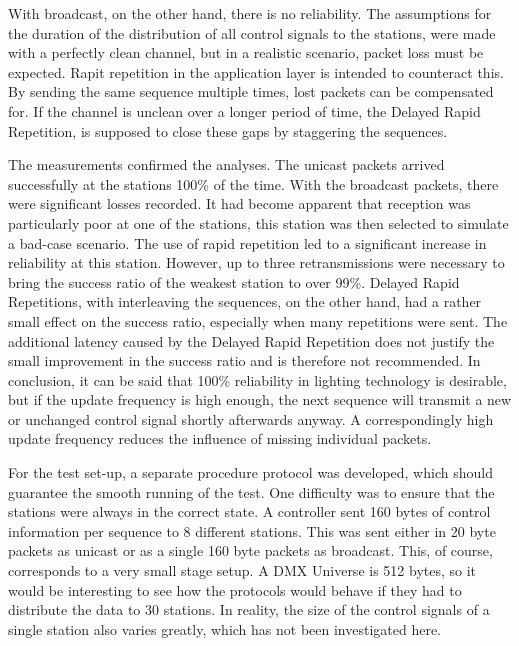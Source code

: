 With broadcast, on the other hand, there is no reliability.
The assumptions for the duration of the distribution of all control signals to the stations,
were made with a perfectly clean channel,
but in a realistic scenario, packet loss must be expected.
Rapit repetition in the application layer is intended to counteract this.
By sending the same sequence multiple times, lost packets can be compensated for.
If the channel is unclean over a longer period of time, the Delayed Rapid Repetition,
is supposed to close these gaps by staggering the sequences.

The measurements confirmed the analyses.
The unicast packets arrived successfully at the stations 100\% of the time.
With the broadcast packets, there were significant losses recorded.
It had become apparent that reception was particularly poor at one of the stations,
this station was then selected to simulate a bad-case scenario.
The use of rapid repetition led to a significant increase in reliability at this station.
However, up to three retransmissions were necessary to bring the success ratio of the weakest station to over 99\%.
Delayed Rapid Repetitions, with interleaving the sequences, on the other hand, 
had a rather small effect on the success ratio,
especially when many repetitions were sent.
The additional latency caused by the Delayed Rapid Repetition
does not justify the small improvement in the success ratio and is therefore not recommended.
In conclusion, it can be said that 100\% reliability in lighting technology is desirable,
but if the update frequency is high enough,
the next sequence will transmit a new or unchanged control signal shortly afterwards anyway.
A correspondingly high update frequency reduces the influence of missing individual packets.

For the test set-up, a separate procedure protocol was developed,
which should guarantee the smooth running of the test.
One difficulty was to ensure that the stations were always in the correct state.
A controller sent 160 bytes of control information per sequence to 8 different stations.
This was sent either in 20 byte packets as unicast or as a single 160 byte packets as broadcast.
This, of course, corresponds to a very small stage setup.
A DMX Universe is 512 bytes, so it would be interesting to see
how the protocols would behave if they had to distribute the data to 30 stations.
In reality, the size of the control signals of a single station also varies greatly,
which has not been investigated here.

